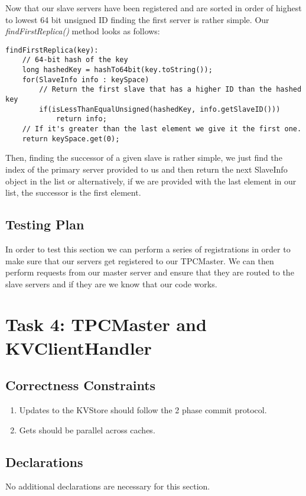 \documentclass{article}
\begin{document}
Now that our slave servers have been registered and are sorted in order of highest to lowest 64 bit unsigned ID finding
the first server is rather simple. Our \textit{findFirstReplica()} method looks as follows:
\begin{verbatim}
findFirstReplica(key):
    // 64-bit hash of the key
    long hashedKey = hashTo64bit(key.toString());
    for(SlaveInfo info : keySpace)
        // Return the first slave that has a higher ID than the hashed key
        if(isLessThanEqualUnsigned(hashedKey, info.getSlaveID()))
            return info;
    // If it's greater than the last element we give it the first one.
    return keySpace.get(0);
\end{verbatim}
Then, finding the successor of a given slave is rather simple, we just find the index of the primary server provided
to us and then return the next SlaveInfo object in the list or alternatively, if we are provided with the last element
in our list, the successor is the first element.

\subsection*{Testing Plan}

In order to test this section we can perform a series of registrations in order to make sure that our servers get
registered to our TPCMaster. We can then perform requests from our master server and ensure that they are routed to the
slave servers and if they are we know that our code works.

\section*{Task 4: TPCMaster and KVClientHandler}
\subsection*{Correctness Constraints}
\begin{enumerate}
\item Updates to the KVStore should follow the 2 phase commit protocol.
\item Gets should be parallel across caches.
\end{enumerate}

\subsection*{Declarations}
No additional declarations are necessary for this section.
\end{document}
